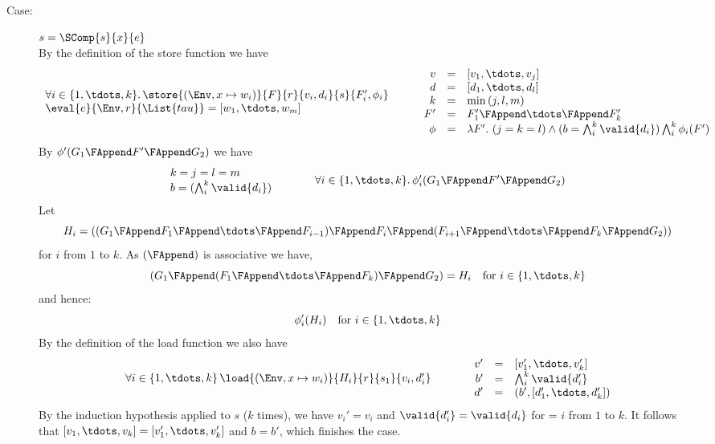 {\begin{description}
\item[Case:] $s = \SComp{s}{x}{e}$\\[1ex]
By the definition of the store function we have
\[
\begin{array}{l}
\forall i \in \{1,\tdots,k\}.\,\store{(\Env, x \mapsto w_i)}{F}{r}{v_i,d_i}{s}{F_i',\phi_i}\\
\eval{e}{\Env,r}{\List{tau}} = [w_1,\tdots,w_m ]\\
\end{array}\hspace*{.75cm}\begin{array}{rcl}
v &=& [v_1,\tdots,v_j]\\
d &=& [d_1,\tdots,d_l]\\
k &=& \min{(j,l,m)}\\
F' &=& F_1' \FAppend \tdots \FAppend F_k'\\
\phi &=& \lambda F'.~(j = k = l) \wedge (b = \bigwedge_i^k \valid{d_i}) \bigwedge_i^k \phi_i(F')\\
\end{array}
\]
By $\phi'(G_1 \FAppend F' \FAppend G_2)$ we have
\[
\begin{array}{l}
k = j = l = m\\
b = (\bigwedge_i^k \valid{d_i})\\
\end{array}\hspace*{1cm}\begin{array}{l}
\forall i \in \{1,\tdots,k\}.\,\phi_i'(G_1 \FAppend F' \FAppend G_2) \\
\end{array}
\]
%
Let
\[
H_i = ((G_1\FAppend F_1\FAppend \tdots \FAppend F_{i-1}) \FAppend F_i \FAppend (F_{i+1} \FAppend \tdots \FAppend F_k \FAppend G_2))
\]
for $i$ from $1$ to $k$. As $(\FAppend)$ is associative we have,
\[
(G_1\FAppend (F_1\FAppend \tdots \FAppend F_k)\FAppend G_2) = H_i \quad \text{for}~i \in \{1,\tdots,k\}
\]
and hence:
\[
\phi_i'(H_i) \quad \text{for}~i \in \{1,\tdots,k\}
\]
%
By the definition of the load function we also have 
\[ 
\begin{array}{l}
\forall i \in \{1,\tdots,k\}\,\load{(\Env, x \mapsto w_i)}{H_i}{r}{s_1}{v_i,d_i'}\\
\end{array}\hspace*{1cm}\begin{array}{rcl}
v' &=& [v_1',\tdots,v_k']\\
b' &=& \bigwedge_i^k \valid{d_i'}\\
d' &=& (b',[d_1',\tdots,d_k'])\\
\end{array}
\]
%
By the induction hypothesis applied to $s$ ($k$ times), we have $v_i'
= v_i$ and $\valid{d_i'} = \valid{d_i}$ for = $i$ from $1$ to
$k$. It follows that $[v_1,\tdots,v_k] = [v_1',\tdots,v_k']$ and $b =
b'$, which finishes the case.


\end{description}}

